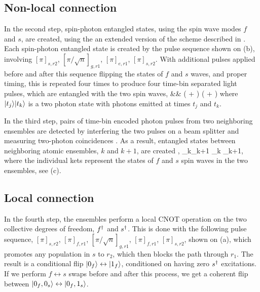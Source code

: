 \subsection{Non-local connection}
In the second step, spin-photon entangled states, using the spin wave modes $f$
and $s$, are created, using the an extended version of the scheme described in
\cite{Li2013}. Each spin-photon entangled state is created by the pulse sequence
shown on (b), involving $[\pi]_{s,r2}$,
$[\pi/\sqrt{n}]_{g,r1}$, $[\pi]_{e,r1}$, $[\pi]_{s,r2}$. With additional pulses
applied before and after this sequence flipping the states of $f$ and $s$ waves,
and proper timing, this is repeated four times to produce four time-bin
separated light pulses, which are entangled with the two spin waves,
\bal
	&& \Big(
	 + 
	\Big)
	\Big(
	 + 
	\Big)
\label{eq:step2}
\eal
where $| t_j \rangle| t_k \rangle$ is a two photon state with photons emitted at times
$t_j$ and $t_k$.


In the third step, pairs of time-bin encoded photon pulses from two neighboring
ensembles are detected by interfering the two pulses on a beam splitter and
measuring two-photon coincidences \cite{Duan2001, Honjo2007, Rubenok2013}.
As a result, entangled states between neighboring atomic ensembles, $k$ and
$k+1$, are created \cite{Lukin2003, Shwa2013},
\bel
	_k_{k+1} \pm {}_k _{k+1},
\eel
where the individual kets represent the states of $f$ and $s$ spin waves in the
two ensembles, see (c).



\subsection{Local connection}
In the fourth step, the ensembles perform a local CNOT operation on the two
collective degrees of freedom, $f^\dagger$ and $s^\dagger$. This is done with the
following pulse sequence, $[\pi]_{s,r2}$, $[\pi]_{f,r1}$,
$[\pi/\sqrt{n}]_{g,r1}$, $[\pi]_{f,r1}$, $[\pi]_{s,r2}$, shown on
(a), which promotes any population in $s$ to $r_2$, which
then blocks the path through $r_1$. The result is a
conditional flip $| 0_f \rangle \leftrightarrow | 1_f \rangle$, conditioned on having zero $s^\dagger$ excitations. If we perform
$f\leftrightarrow s$ swaps before and after this process, we get a coherent flip
between $| 0_f, 0_s \rangle \leftrightarrow | 0_f, 1_s \rangle$. 

